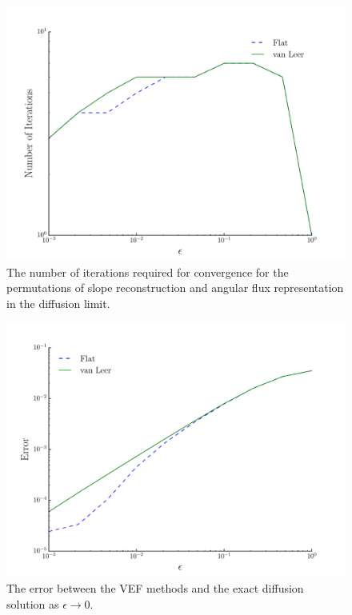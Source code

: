 	\begin{figure}
		\centering
		\includegraphics[width=.75\textwidth]{figs/dl_it.pdf}
		\caption{The number of iterations required for convergence for the permutations of slope reconstruction and angular flux representation in the diffusion limit. }
		\label{fig:dl_it}
	\end{figure}
	\begin{figure}
		\centering
		\includegraphics[width=.75\textwidth]{figs/dl_err.pdf}
		\caption{The error between the VEF methods and the exact diffusion solution as $\epsilon \rightarrow 0$. }
		\label{fig:dl_err}
	\end{figure}